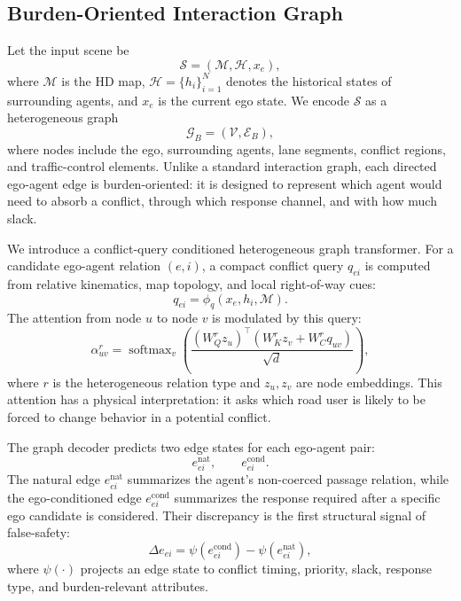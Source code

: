 \documentclass[10pt]{article}
\begin{document}
\subsection{Burden-Oriented Interaction Graph}
\label{sec:method_graph}

Let the input scene be
\begin{equation}
    \mathcal{S} = (\mathcal{M}, \mathcal{H}, x_e),
\end{equation}
where $\mathcal{M}$ is the HD map, $\mathcal{H}=\{h_i\}_{i=1}^{N}$ denotes the historical states of surrounding agents, and $x_e$ is the current ego state. We encode $\mathcal{S}$ as a heterogeneous graph
\begin{equation}
    \mathcal{G}_B = (\mathcal{V}, \mathcal{E}_B),
\end{equation}
where nodes include the ego, surrounding agents, lane segments, conflict regions, and traffic-control elements. Unlike a standard interaction graph, each directed ego-agent edge is burden-oriented: it is designed to represent which agent would need to absorb a conflict, through which response channel, and with how much slack.

We introduce a conflict-query conditioned heterogeneous graph transformer. For a candidate ego-agent relation $(e,i)$, a compact conflict query $q_{ei}$ is computed from relative kinematics, map topology, and local right-of-way cues:
\begin{equation}
    q_{ei} = \phi_q(x_e, h_i, \mathcal{M}).
\end{equation}
The attention from node $u$ to node $v$ is modulated by this query:
\begin{equation}
    \alpha^{r}_{uv}
    =
    \operatorname{softmax}_{v}
    \left(
    \frac{
    (W^{r}_{Q} z_u)^\top
    (W^{r}_{K} z_v + W^{r}_{C} q_{uv})
    }{\sqrt{d}}
    \right),
\end{equation}
where $r$ is the heterogeneous relation type and $z_u,z_v$ are node embeddings. This attention has a physical interpretation: it asks which road user is likely to be forced to change behavior in a potential conflict.

The graph decoder predicts two edge states for each ego-agent pair:
\begin{equation}
    e^{\mathrm{nat}}_{ei}, \qquad e^{\mathrm{cond}}_{ei}.
\end{equation}
The natural edge $e^{\mathrm{nat}}_{ei}$ summarizes the agent's non-coerced passage relation, while the ego-conditioned edge $e^{\mathrm{cond}}_{ei}$ summarizes the response required after a specific ego candidate is considered. Their discrepancy is the first structural signal of false-safety:
\begin{equation}
    \Delta e_{ei}
    =
    \psi(e^{\mathrm{cond}}_{ei})-\psi(e^{\mathrm{nat}}_{ei}),
\end{equation}
where $\psi(\cdot)$ projects an edge state to conflict timing, priority, slack, response type, and burden-relevant attributes.
\end{document}
